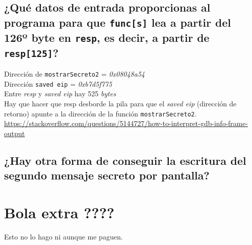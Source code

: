 \documentclass[10pt,a4paper]{article}
\begin{document}
\subsection{¿Qué datos de entrada proporcionas al programa para que \texttt{func[s]} lea a partir del 126º byte en \texttt{resp}, es decir, a partir de \texttt{resp[125]}?}


Dirección de \texttt{mostrarSecreto2} = \emph{0x08048a54}\\
Dirección \texttt{saved eip} = \emph{0xb7d5f775}\\
Entre \emph{resp} y \emph{saved eip} hay 525 \emph{bytes}\\
Hay que hacer que resp desborde la pila para que el \emph{saved eip} (dirección de retorno) apunte a la dirección de la función \texttt{mostrarSecreto2}. \\


\url{https://stackoverflow.com/questions/5144727/how-to-interpret-gdb-info-frame-output}


\subsection{¿Hay otra forma de conseguir la escritura del segundo mensaje secreto por pantalla?}


\section{Bola extra ????}

Esto no lo hago ni aunque me paguen. 
\end{document}
